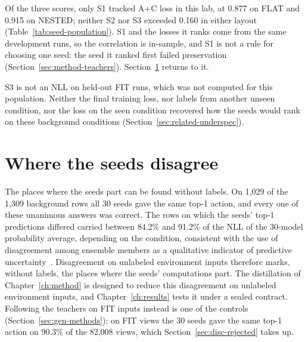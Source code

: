 Of the three scores, only S1 tracked A+C loss in this lab, at 0.877 on
FLAT and 0.915 on NESTED; neither S2 nor S3 exceeded 0.160 in either
layout (Table~\ref{tab:seed-population}).
S1 and the losses it ranks come from the same development runs, so
the correlation is in-sample, and S1 is not a rule for choosing one
seed: the seed it ranked first failed preservation
(Section~\ref{sec:method-teachers}).
Section~\ref{sec:diag-agreement} returns to it.

S3 is not an NLL on held-out FIT runs, which was not computed for this
population. Neither the final training loss, nor labels from another
unseen condition, nor the loss on the seen condition recovered how the
seeds would rank on these background conditions
(Section~\ref{sec:related-underspec}).

\section{Where the seeds disagree}
\label{sec:diag-agreement}

The places where the seeds part can be found without labels. On 1,029 of the
1,309 background rows all 30 seeds gave the same top-1 action, and
every one of these unanimous answers was correct. The rows on which the
seeds' top-1 predictions differed carried between 84.2\% and 91.2\%
of the NLL of the 30-model probability average, depending on the
condition, consistent with the use of disagreement among ensemble
members as a qualitative indicator of predictive
uncertainty~\cite{lakshminarayanan2016simple}.
Disagreement on unlabeled
environment inputs therefore marks, without labels, the places where
the seeds' computations part. The distillation of
Chapter~\ref{ch:method} is designed to reduce this disagreement on
unlabeled environment inputs, and Chapter~\ref{ch:results} tests it
under a sealed contract. Following the teachers on FIT inputs instead is
one of the controls (Section~\ref{sec:gen-methods}); on FIT views the
30 seeds gave the same top-1 action on 90.3\% of the 82,008 views,
which Section~\ref{sec:disc-rejected} takes up.

